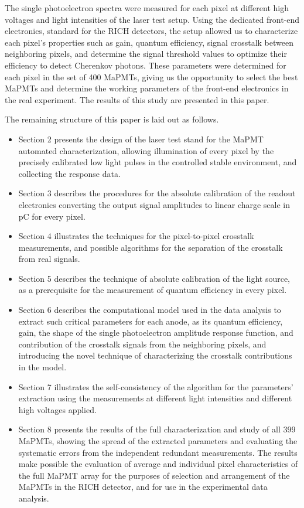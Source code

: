 The single photoelectron spectra were measured for each pixel at different high voltages and light intensities of the laser test setup.
Using the dedicated front-end electronics, standard for the RICH detectors, the setup allowed us to characterize each pixel’s properties such as gain, quantum efficiency, signal crosstalk between neighboring pixels, and determine the signal threshold values to optimize their efficiency to detect Cherenkov photons.
These parameters were determined for each pixel in the set of 400 MaPMTs, giving us the opportunity to select the best MaPMTs and determine the working parameters of the front-end electronics in the real experiment.
The results of this study are presented in this paper. 


The remaining structure of this paper is laid out as follows. 
\begin{itemize}
	\item Section 2 presents the design of the laser test stand for the MaPMT automated characterization, allowing illumination of every pixel by the precisely calibrated low light pulses in the controlled stable environment, and collecting the response data. 
	\item Section 3 describes the procedures for the absolute calibration of the readout electronics converting the output signal amplitudes to linear charge scale in pC for every pixel. 
	\item Section 4 illustrates the techniques for the pixel-to-pixel crosstalk measurements, and possible algorithms for the separation of the crosstalk from real signals. 
	\item Section 5 describes the technique of absolute calibration of the light source, as a prerequisite for the measurement of quantum efficiency in every pixel. 
	\item Section 6 describes the computational model used in the data analysis to extract such critical parameters for each anode, as its quantum efficiency, gain, the shape of the single photoelectron amplitude response function, and contribution of the crosstalk signals from the neighboring pixels, and introducing the novel technique of characterizing the crosstalk contributions in the model. 
	\item Section 7 illustrates the self-consistency of the algorithm for the parameters' extraction using the measurements at different light intensities and different high voltages applied. 
	\item Section 8 presents the results of the full characterization and study of all 399 MaPMTs, showing the spread of the extracted parameters and evaluating the systematic errors from the independent redundant measurements. The results make possible the evaluation of average and individual pixel characteristics of the full MaPMT array for the purposes of selection and arrangement of the MaPMTs in the RICH detector, and for use in the experimental data analysis.
\end{itemize}

